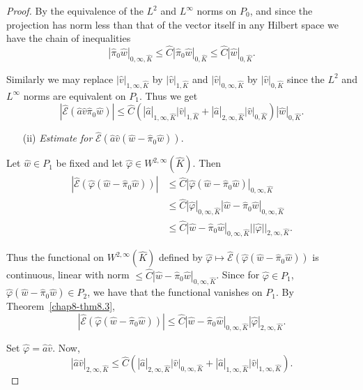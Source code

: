 \begin{proof}
By the equivalence of the $L^{2}$ and $L^{\infty}$ norms on $P_{0}$,
and since the projection has norm less than that of the vector itself
in any Hilbert space we have the chain of inequalities
$$
|\hat{\pi}_{0}\hat{w}|_{0,\infty,\hat{K}}\leq\hat{C}|\hat{\pi}_{0}\hat{w}|_{0,\hat{K}}\leq \hat{C}|\hat{w}|_{0,\hat{K}}.
$$\pageoriginale

Similarly we may replace $|\hat{v}|_{1,\infty,\hat{K}}$ by
$|\hat{v}|_{1,\hat{K}}$ and $|\hat{v}|_{0,\infty,\hat{K}}$ by
$|\hat{v}|_{0,\hat{K}}$ since the $L^{2}$ and $L^{\infty}$ norms are
  equivalent on $P_{1}$. Thus we get
\begin{equation*}
|\hat{\mathscr{E}}(\hat{a}\hat{v}\hat{\pi}_{0}\hat{w})|\leq
\hat{C}(|\hat{a}|_{1,\infty,\hat{K}}|\hat{v}|_{1,\hat{K}}+|\hat{a}|_{2,\infty,\hat{K}}|\hat{v}|_{0,\hat{K}})|\hat{w}|_{0,\hat{K}}. \tag{8.37}\label{chap8-eq8.37} 
\end{equation*}

\begin{itemize}
\item[(ii)] {\em Estimate for}
  $\hat{\mathscr{E}}(\hat{a}\hat{v}(\hat{w}-\hat{\pi}_{0}\hat{w}))$.
\end{itemize}

Let $\hat{w}\in P_{1}$ be fixed and let $\hat{\varphi}\in
W^{2,\infty}(\hat{K})$. Then
\begin{align*}
|\hat{\mathscr{E}}(\hat{\varphi}(\hat{w}-\hat{\pi}_{0}\hat{w}))| &\leq
\hat{C}|\hat{\varphi}(\hat{w}-\hat{\pi}_{0}\hat{w})|_{0,\infty,\hat{K}}\\ 
&\leq
\hat{C}|\hat{\varphi}|_{0,\infty,\hat{K}}|\hat{w}-\hat{\pi}_{0}\hat{w}|_{0,\infty,\hat{K}}\\ 
&\leq
\hat{C}|\hat{w}-\hat{\pi}_{0}\hat{w}|_{0,\infty,\hat{K}}||\hat{\varphi}||_{2,\infty,\hat{K}}. 
\end{align*}

Thus the functional on $W^{2,\infty}(\hat{K})$ defined by
$\hat{\varphi}\mapsto
\hat{\mathscr{E}}(\hat{\varphi}(\hat{w}-\hat{\pi}_{0}\hat{w}))$ is
continuous, linear with norm $\leq
\hat{C}|\hat{w}-\hat{\pi}_{0}\hat{w}|_{0,\infty,\hat{K}}$. Since for
$\hat{\varphi}\in P_{1}$,
$\hat{\varphi}(\hat{w}-\hat{\pi}_{0}\hat{w})\in P_{2}$, we have that
the functional vanishes on $P_{1}$. By Theorem~\ref{chap8-thm8.3},
$$
|\hat{\mathscr{E}}(\hat{\varphi}(\hat{w}-\hat{\pi}_{0}\hat{w}))|\leq
\hat{C}|\hat{w}-\hat{\pi}_{0}\hat{w}|_{0,\infty,\hat{K}}|\hat{\varphi}|_{2,\infty,\hat{K}}. 
$$

Set $\hat{\varphi}=\hat{a}\hat{v}$. Now,
$$
|\hat{a}\hat{v}|_{2,\infty,\hat{K}}\leq
\hat{C}(|\hat{a}|_{2,\infty,\hat{K}}|\hat{v}|_{0,\infty,\hat{K}}+|\hat{a}|_{1,\infty,\hat{K}}|\hat{v}|_{1,\infty,\hat{K}}). 
$$


\end{proof}

